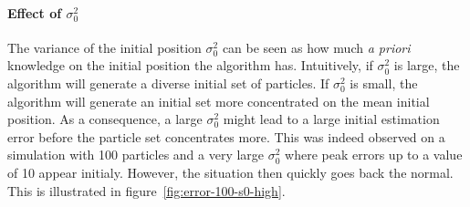 \documentclass[english, DIV=13]{scrartcl}
\begin{document}
\paragraph{Effect of $\sigma^2_0$}
The variance of the initial position $\sigma^2_0$ can be seen as how much
\textit{a priori} knowledge on the initial position the algorithm has.
Intuitively, if $\sigma^2_0$ is large, the algorithm will generate a diverse initial set
of particles. If $\sigma^2_0$ is small, the algorithm will generate an initial set more
concentrated on the mean initial position. As a consequence, a large $\sigma^2_0$ might
lead to a large initial estimation error before the particle set concentrates more. This
was indeed observed on a simulation with 100 particles and a very large $\sigma^2_0$ where
peak errors up to a value of 10 appear initialy. However, the situation then quickly goes
back the normal. This is illustrated in figure~\ref{fig:error-100-s0-high}.
\end{document}
